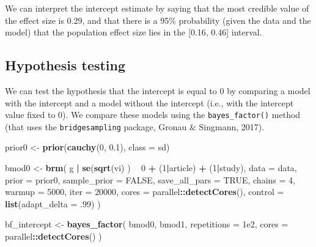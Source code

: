 \documentclass[floatsintext,doc]{apa6}
\newenvironment{Shaded}{\begin{snugshade}}{\end{snugshade}}
\newcommand{\DataTypeTok}[1]{\textcolor[rgb]{0.13,0.29,0.53}{#1}}
\newcommand{\DecValTok}[1]{\textcolor[rgb]{0.00,0.00,0.81}{#1}}
\newcommand{\FloatTok}[1]{\textcolor[rgb]{0.00,0.00,0.81}{#1}}
\newcommand{\KeywordTok}[1]{\textcolor[rgb]{0.13,0.29,0.53}{\textbf{#1}}}
\newcommand{\NormalTok}[1]{#1}
\newcommand{\OperatorTok}[1]{\textcolor[rgb]{0.81,0.36,0.00}{\textbf{#1}}}
\newcommand{\OtherTok}[1]{\textcolor[rgb]{0.56,0.35,0.01}{#1}}
\newcommand{\StringTok}[1]{\textcolor[rgb]{0.31,0.60,0.02}{#1}}
\begin{document}
We can interpret the intercept estimate by saying that the most credible value of the effect size is 0.29, and that there is a 95\% probability (given the data and the model) that the population effect size lies in the {[}0.16, 0.46{]} interval.

\hypertarget{hypothesis-testing}{%
\subsection{Hypothesis testing}\label{hypothesis-testing}}

We can test the hypothesis that the intercept is equal to 0 by comparing a model with the intercept and a model without the intercept (i.e., with the intercept value fixed to 0). We compare these models using the \texttt{bayes\_factor()} method (that uses the \texttt{bridgesampling} package, Gronau \& Singmann, 2017).

\begin{Shaded}
\begin{Highlighting}[]
\NormalTok{prior0 <-}\StringTok{ }\KeywordTok{prior}\NormalTok{(}\KeywordTok{cauchy}\NormalTok{(}\DecValTok{0}\NormalTok{, }\FloatTok{0.1}\NormalTok{), }\DataTypeTok{class =}\NormalTok{ sd)}

\NormalTok{bmod0 <-}\StringTok{ }\KeywordTok{brm}\NormalTok{(}
\NormalTok{    g }\OperatorTok{|}\StringTok{ }\KeywordTok{se}\NormalTok{(}\KeywordTok{sqrt}\NormalTok{(vi) ) }\OperatorTok{~}\StringTok{ }\DecValTok{0} \OperatorTok{+}\StringTok{ }\NormalTok{(}\DecValTok{1}\OperatorTok{|}\NormalTok{article) }\OperatorTok{+}\StringTok{ }\NormalTok{(}\DecValTok{1}\OperatorTok{|}\NormalTok{study),}
    \DataTypeTok{data =}\NormalTok{ data,}
    \DataTypeTok{prior =}\NormalTok{ prior0,}
    \DataTypeTok{sample_prior =} \OtherTok{FALSE}\NormalTok{,}
    \DataTypeTok{save_all_pars =} \OtherTok{TRUE}\NormalTok{,}
    \DataTypeTok{chains =} \DecValTok{4}\NormalTok{,}
    \DataTypeTok{warmup =} \DecValTok{5000}\NormalTok{,}
    \DataTypeTok{iter =} \DecValTok{20000}\NormalTok{,}
    \DataTypeTok{cores =}\NormalTok{ parallel}\OperatorTok{::}\KeywordTok{detectCores}\NormalTok{(),}
    \DataTypeTok{control =} \KeywordTok{list}\NormalTok{(}\DataTypeTok{adapt_delta =} \FloatTok{.99}\NormalTok{)}
\NormalTok{    )}

\NormalTok{bf_intercept <-}\StringTok{ }\KeywordTok{bayes_factor}\NormalTok{(}
\NormalTok{    bmod0, bmod1,}
    \DataTypeTok{repetitions =} \FloatTok{1e2}\NormalTok{, }\DataTypeTok{cores =}\NormalTok{ parallel}\OperatorTok{::}\KeywordTok{detectCores}\NormalTok{()}
\NormalTok{    )}
\end{Highlighting}
\end{Shaded}
\end{document}
